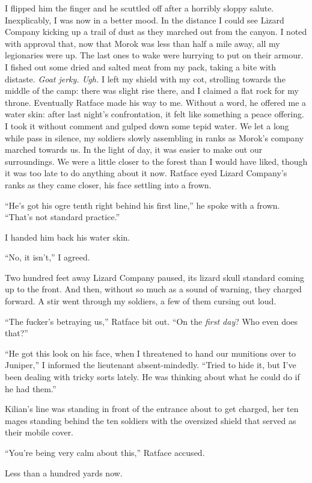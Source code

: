 \documentclass[12pt, openany]{book}
\begin{document}
I flipped him the finger and he scuttled off after a horribly sloppy salute. Inexplicably, I was now in a better mood. In the distance I could see Lizard Company kicking up a trail of dust as they marched out from the canyon. I noted with approval that, now that Morok was less than half a mile away, all my legionaries were up. The last ones to wake were hurrying to put on their armour. I fished out some dried and salted meat from my pack, taking a bite with distaste. \textit{Goat jerky. Ugh. }I left my shield with my cot, strolling towards the middle of the camp: there was slight rise there, and I claimed a flat rock for my throne. Eventually Ratface made his way to me. Without a word, he offered me a water skin: after last night’s confrontation, it felt like something a peace offering. I took it without comment and gulped down some tepid water. We let a long while pass in silence, my soldiers slowly assembling in ranks as Morok’s company marched towards us. In the light of day, it was easier to make out our surroundings. We were a little closer to the forest than I would have liked, though it was too late to do anything about it now. Ratface eyed Lizard Company’s ranks as they came closer, his face settling into a frown.

“He’s got his ogre tenth right behind his first line,” he spoke with a frown. “That’s not standard practice.”

I handed him back his water skin.

“No, it isn’t,” I agreed.

Two hundred feet away Lizard Company paused, its lizard skull standard coming up to the front. And then, without so much as a sound of warning, they charged forward. A stir went through my soldiers, a few of them cursing out loud.

“The fucker’s betraying us,” Ratface bit out. “On the \textit{first day}? Who even does that?”

“He got this look on his face, when I threatened to hand our munitions over to Juniper,” I informed the lieutenant absent-mindedly. “Tried to hide it, but I’ve been dealing with tricky sorts lately. He was thinking about what he could do if he had them.”

Kilian’s line was standing in front of the entrance about to get charged, her ten mages standing behind the ten soldiers with the oversized shield that served as their mobile cover. 

“You’re being very calm about this,” Ratface accused.

Less than a hundred yards now. 
\end{document}
